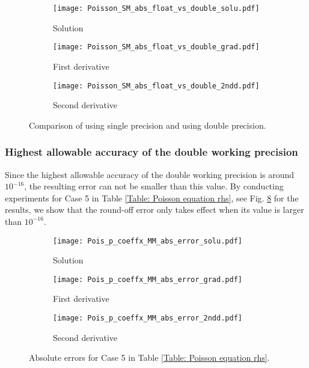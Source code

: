 \documentclass[final,3p]{elsarticle}
\begin{document}
\begin{figure}[!ht]
    \begin{subfigure}{5.5cm}
        \texttt{[image: Poisson\_SM\_abs\_float\_vs\_double\_solu.pdf]}
        \caption{Solution}
        \label{Fig:Poisson_SM_abs_float_vs_double_solu}
    \end{subfigure}
    \begin{subfigure}{5.5cm}
        \texttt{[image: Poisson\_SM\_abs\_float\_vs\_double\_grad.pdf]}
        \caption{First derivative}	
        \label{Fig:Poisson_SM_abs_float_vs_double_grad}
    \end{subfigure}
    \begin{subfigure}{5.5cm}
        \texttt{[image: Poisson\_SM\_abs\_float\_vs\_double\_2ndd.pdf]}
        \caption{Second derivative}
        \label{Fig:Poisson_SM_abs_float_vs_double_2ndd}
    \end{subfigure}
\caption{Comparison of using single precision and using double precision.}
\label{Poisson_SM_abs_float_vs_double}
\end{figure}

\newpage
\subsubsection{Highest allowable accuracy of the double working precision}

Since the highest allowable accuracy of the double working precision is around $10^{-16}$, the resulting error can not be smaller than this value.
By conducting experiments for Case 5 in Table \ref{Table: Poisson equation rhs}, see Fig. \ref{Fig:Pois_p_coeffx_MM_abs_error} for the results, we show that the round-off error only takes effect when its value is larger than $10^{-16}$.

\begin{figure}[!ht]
    \begin{subfigure}{5.5cm}
        \texttt{[image: Pois\_p\_coeffx\_MM\_abs\_error\_solu.pdf]}
        \caption{Solution}
        \label{Fig:Pois_p_coeffx_MM_abs_error_solu}
    \end{subfigure}
    \begin{subfigure}{5.5cm}
        \texttt{[image: Pois\_p\_coeffx\_MM\_abs\_error\_grad.pdf]}
        \caption{First derivative}
        \label{Fig:Pois_p_coeffx_MM_abs_error_grad}
    \end{subfigure}
    \begin{subfigure}{5.5cm}
        \texttt{[image: Pois\_p\_coeffx\_MM\_abs\_error\_2ndd.pdf]}
        \caption{Second derivative}
        \label{Fig:Pois_p_coeffx_MM_abs_error_2ndd}
    \end{subfigure}
\caption{Absolute errors for Case 5 in Table \ref{Table: Poisson equation rhs}.}
\label{Fig:Pois_p_coeffx_MM_abs_error}
\end{figure}
\end{document}
